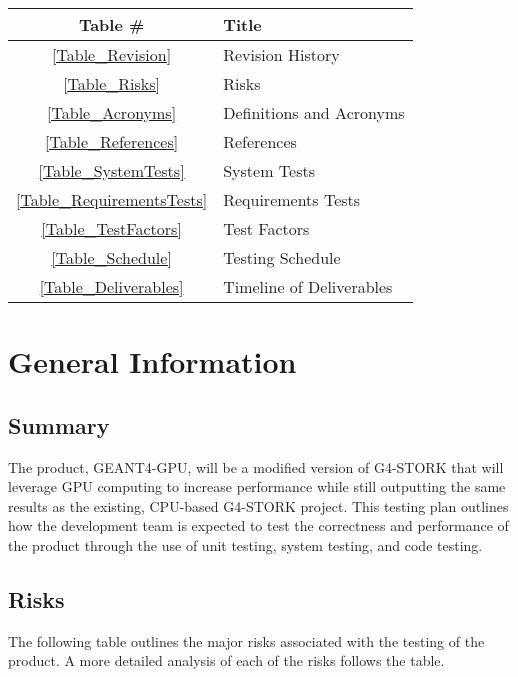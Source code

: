 \documentclass[12pt]{article}
\begin{document}
\begin{center}
\begin{tabular}{cl}
\toprule

\bf Table \# & \bf Title\\\midrule
\ref{Table_Revision} & Revision History\\
\ref{Table_Risks} & Risks\\
\ref{Table_Acronyms} & Definitions and Acronyms\\
\ref{Table_References} & References\\
\ref{Table_SystemTests} & System Tests\\
\ref{Table_RequirementsTests} & Requirements Tests\\
\ref{Table_TestFactors} & Test Factors\\
\ref{Table_Schedule} & Testing Schedule\\
\ref{Table_Deliverables} & Timeline of Deliverables\\

\bottomrule
\end{tabular}
\end{center}


\section{General Information}

\subsection{Summary} %
The product, GEANT4-GPU, will be a modified version of G4-STORK that will leverage GPU computing to increase performance while still outputting the same results as the existing, CPU-based G4-STORK project. This testing plan outlines how the development team is expected to test the correctness and performance of the product through the use of unit testing, system testing, and code testing.
\newpage
\subsection{Risks} %
The following table outlines the major risks associated with the testing of the product. A more detailed analysis of each of the risks follows the table.
\end{document}
